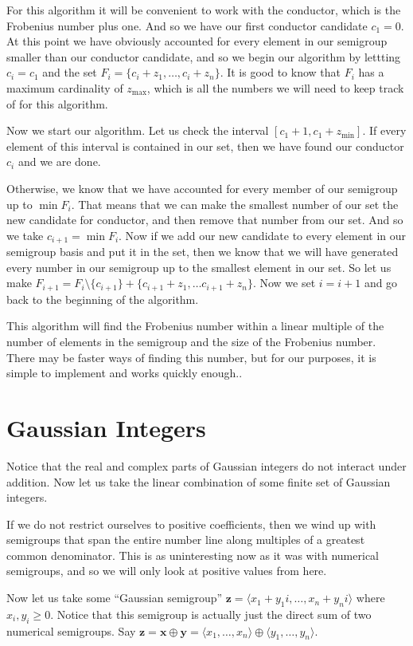 \documentclass[11pt]{amsart}
\theoremstyle{plain}
\theoremstyle{definition}
\begin{document}
For this algorithm it will be convenient to work with the conductor, which is the Frobenius number plus one.
And so we have our first conductor candidate $c_1=0$.
At this point we have obviously accounted for every element in our semigroup smaller than our conductor candidate, and so we begin our algorithm by lettting $c_i=c_1$ and the set $F_i=\{c_i+z_1,\dots,c_i+z_n\}$.
It is good to know that $F_i$ has a maximum cardinality of $z_\text{max}$, which is all the numbers we will need to keep track of for this algorithm.

Now we start our algorithm.
Let us check the interval $[c_1+1,c_1+z_\text{min}]$.
If every element of this interval is contained in our set, then we have found our conductor $c_i$ and we are done.

Otherwise, we know that we have accounted for every member of our semigroup up to $\min F_i$. That means that we can make the smallest number of our set the new candidate for conductor, and then remove that number from our set. And so we take $c_{i+1}=\min F_i$. Now if we add our new candidate to every element in our semigroup basis and put it in the set, then we know that we will have generated every number in our semigroup up to the smallest element in our set. So let us make $F_{i+1}=F_i\setminus \{c_{i+1}\} + \{c_{i+1}+z_1,\dots c_{i+1}+z_n\}$. Now we set $i=i+1$ and go back to the beginning of the algorithm.

This algorithm will find the Frobenius number within a linear multiple of the number of elements in the semigroup and the size of the Frobenius number. There may be faster ways of finding this number, but for our purposes, it is simple to implement and works quickly enough.\cite{frobmask}.

\section{Gaussian Integers}
Notice that the real and complex parts of Gaussian integers do not interact under addition. Now let us take the linear combination of some finite set of Gaussian integers.

If we do not restrict ourselves to positive coefficients, then we wind up with semigroups that span the entire number line along multiples of a greatest common denominator. This is as uninteresting now as it was with numerical semigroups, and so we will only look at positive values from here.

Now let us take some ``Gaussian semigroup'' $\mathbf{z}=\langle x_1+y_1i,\dots,x_n+y_ni\rangle$ where $x_i,y_i\ge 0$. Notice that this semigroup is actually just the direct sum of two numerical semigroups. Say $\mathbf{z}=\mathbf{x}\oplus\mathbf{y}=\langle x_1,\dots,x_n\rangle\oplus\langle y_1,\dots,y_n\rangle$.
\end{document}
